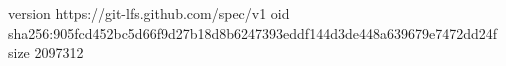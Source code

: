version https://git-lfs.github.com/spec/v1
oid sha256:905fcd452bc5d66f9d27b18d8b6247393eddf144d3de448a639679e7472dd24f
size 2097312
